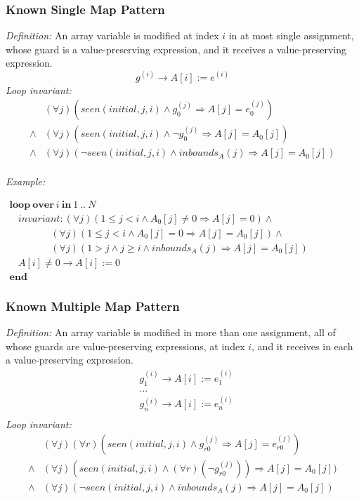 \documentclass[a4paper,10pt]{article}
\newcommand{\idx}{\ensuremath{i}\xspace}
\newcommand{\idxinitial}{\ensuremath{\mathit{initial}}\xspace}
\newcommand{\KWloop}{\ensuremath{\mathrm{\textbf{loop}}~}}
\newcommand{\KWend}{\ensuremath{\mathrm{\textbf{end}}~}}
\newcommand{\KWover}{\ensuremath{\mathrm{\textbf{over}}~}}
\newcommand{\KWin}{\ensuremath{~\mathrm{\textbf{in}}~}}
\newcommand{\at}[1]{{(#1)}}
\newcommand{\impl}{\ensuremath{\Longrightarrow}}
\newcommand{\inbounds}[2]{\ensuremath{\mathit{inbounds}_{#1}(#2)}\xspace}
\newcommand{\seen}[3]{\ensuremath{\mathit{seen}{(#1,#2,#3)}}\xspace}
\newcommand{\loopinvariant}{\noindent\textit{Loop invariant:}\xspace}
\newcommand{\patterndef}{\noindent\textit{Definition:}\xspace}
\newcommand{\patternexample}{\noindent\textit{Example:}\xspace}
\begin{document}
\subsubsection*{Known Single Map Pattern}

\patterndef An array variable is modified at index \idx in at most single assignment, whose
guard is a value-preserving expression, and it receives a value-preserving expression.
%
$$g^\at{\idx} \rightarrow A[\idx] := e^\at{\idx}$$
%
\loopinvariant
%
\begin{eqnarray*}
&(\forall j)(\seen{\idxinitial}{j}{\idx} \land g_0^\at{j} \impl A[j] = e_0^\at{j}) \\
\land&(\forall j)(\seen{\idxinitial}{j}{\idx} \land \neg g_0^\at{j} \impl A[j] = A_0[j]) \\
\land&
 (\forall j)(\neg \seen{\idxinitial}{j}{\idx} \land \inbounds{A}{j} \impl A[j] = A_0[j])\\
\end{eqnarray*}

\bigskip
\patternexample

\medskip
$\begin{array}{l}
  \KWloop \KWover i \KWin 1~..~N \\
  ~~~~ \textit{invariant}: (\forall j)(1 \leq j < i \land A_0[j] \neq 0 \impl A[j] = 0) \land\\
  ~~~~~~~~~~~~~~~~~~~ (\forall j)(1 \leq j < i \land A_0[j] = 0 \impl A[j] = A_0[j]) \land\\
  ~~~~~~~~~~~~~~~~~~~ (\forall j)(1 > j \land j \geq i \land \inbounds{A}{j} \impl A[j] = A_0[j])\\
  ~~~~ A[i] \neq 0 \rightarrow A[i] := 0\\
  \KWend
\end{array}$

\subsubsection*{Known Multiple Map Pattern}

\patterndef An array variable is modified in more than one assignment, all
of whose guards are value-preserving expressions, at index \idx, and it receives in each a
value-preserving expression.
%
\begin{eqnarray*}
&g_1^\at{\idx} \rightarrow A[\idx] := e_1^\at{\idx}\\
&...\\
&g_n^\at{\idx} \rightarrow A[\idx] := e_n^\at{\idx}\\
\end{eqnarray*}
%
\loopinvariant
%
\begin{eqnarray*}
&(\forall j)(\forall r)(\seen{\idxinitial}{j}{\idx} \land g_{r0}^\at{j} \impl A[j] = e_{r0}^\at{j}) \\
\land&(\forall j)(\seen{\idxinitial}{j}{\idx} \land (\forall r) (\neg g_{r0}^\at{j})) \impl A[j] = A_0[j]) \\
\land&
 (\forall j)(\neg \seen{\idxinitial}{j}{\idx} \land \inbounds{A}{j} \impl A[j] = A_0[j])\\
\end{eqnarray*}
\end{document}
